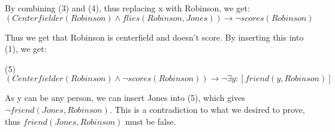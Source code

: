\begin{large}
    By combining (3) and (4), thus replacing x with Robinson, we get:
    $(Centerfielder(Robinson) \land flies(Robinson, Jones)) \rightarrow \neg scores(Robinson)$

    Thus we get that Robinson is centerfield and doesn't score. By inserting this into (1), we get:

    (5) $(Centerfielder(Robinson) \land \neg scores(Robinson)) \rightarrow \neg \exists y : [friend(y, Robinson)]$

    As y can be any person, we can insert Jones into (5), which gives $\neg friend(Jones, Robinson)$.
    This is a contradiction to what we desired to prove, thus $friend(Jones, Robinson)$ must be false.
\end{large}